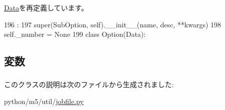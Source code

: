 \hyperlink{classm5_1_1util_1_1jobfile_1_1Data_ac775ee34451fdfa742b318538164070e}{Data}を再定義しています。


\begin{DoxyCode}
196                                             :
197         super(SubOption, self).__init__(name, desc, **kwargs)
198         self._number = None
199 
class Option(Data):
\end{DoxyCode}


\subsection{変数}
\hypertarget{classm5_1_1util_1_1jobfile_1_1SubOption_a323644ffc835b0fba1e3e75e7ee48903}{
\subsubsection[{\_\-number}]{}}
\label{classm5_1_1util_1_1jobfile_1_1SubOption_a323644ffc835b0fba1e3e75e7ee48903}


このクラスの説明は次のファイルから生成されました:\begin{DoxyCompactItemize}
\item 
python/m5/util/\hyperlink{jobfile_8py}{jobfile.py}\end{DoxyCompactItemize}
